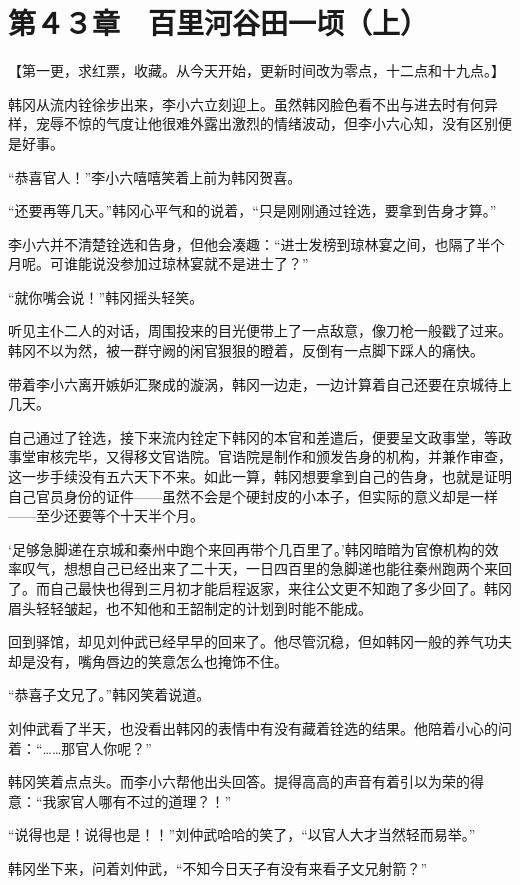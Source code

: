 \section{第４３章　百里河谷田一顷（上）}

【第一更，求红票，收藏。从今天开始，更新时间改为零点，十二点和十九点。】

韩冈从流内铨徐步出来，李小六立刻迎上。虽然韩冈脸色看不出与进去时有何异样，宠辱不惊的气度让他很难外露出激烈的情绪波动，但李小六心知，没有区别便是好事。

“恭喜官人！”李小六嘻嘻笑着上前为韩冈贺喜。

“还要再等几天。”韩冈心平气和的说着，“只是刚刚通过铨选，要拿到告身才算。”

李小六并不清楚铨选和告身，但他会凑趣：“进士发榜到琼林宴之间，也隔了半个月呢。可谁能说没参加过琼林宴就不是进士了？”

“就你嘴会说！”韩冈摇头轻笑。

听见主仆二人的对话，周围投来的目光便带上了一点敌意，像刀枪一般戳了过来。韩冈不以为然，被一群守阙的闲官狠狠的瞪着，反倒有一点脚下踩人的痛快。

带着李小六离开嫉妒汇聚成的漩涡，韩冈一边走，一边计算着自己还要在京城待上几天。

自己通过了铨选，接下来流内铨定下韩冈的本官和差遣后，便要呈文政事堂，等政事堂审核完毕，又得移文官诰院。官诰院是制作和颁发告身的机构，并兼作审查，这一步手续没有五六天下不来。如此一算，韩冈想要拿到自己的告身，也就是证明自己官员身份的证件——虽然不会是个硬封皮的小本子，但实际的意义却是一样——至少还要等个十天半个月。

‘足够急脚递在京城和秦州中跑个来回再带个几百里了。’韩冈暗暗为官僚机构的效率叹气，想想自己已经出来了二十天，一日四百里的急脚递也能往秦州跑两个来回了。而自己最快也得到三月初才能启程返家，来往公文更不知跑了多少回了。韩冈眉头轻轻皱起，也不知他和王韶制定的计划到时能不能成。

回到驿馆，却见刘仲武已经早早的回来了。他尽管沉稳，但如韩冈一般的养气功夫却是没有，嘴角唇边的笑意怎么也掩饰不住。

“恭喜子文兄了。”韩冈笑着说道。

刘仲武看了半天，也没看出韩冈的表情中有没有藏着铨选的结果。他陪着小心的问着：“……那官人你呢？”

韩冈笑着点点头。而李小六帮他出头回答。提得高高的声音有着引以为荣的得意：“我家官人哪有不过的道理？！”

“说得也是！说得也是！！”刘仲武哈哈的笑了，“以官人大才当然轻而易举。”

韩冈坐下来，问着刘仲武，“不知今日天子有没有来看子文兄射箭？”

